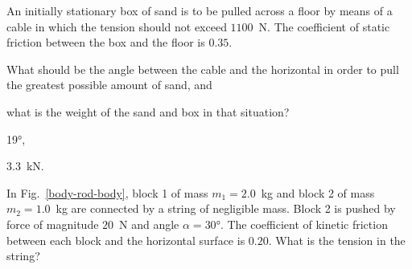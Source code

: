 \begin{problem}
	An initially stationary box of sand is to be pulled across a floor by means of a cable in which the tension should not exceed $1100$~N. The coefficient of static friction between the box and the floor is $0.35$. 
	\begin{enumerate*}[label = (\alph*)]
		\item What should be the angle between the cable and the horizontal in order to pull the greatest possible amount of sand, and
		\item  what is the weight of the sand and box in that situation?
	\end{enumerate*}
	\begin{solution}
		\begin{enumerate*}[label = (\alph*)]
			\item \ang{19},
			\item $3.3$~\si{\kilo\newton}.
		\end{enumerate*}
	\end{solution}
\end{problem}


\begin{problem}\label{prb:body-rod-body}
	In Fig.~\ref{body-rod-body}, block 1 of mass $m_1 = 2.0$~kg and block 2 of mass $m_2 = 1.0$~kg are connected by a string of negligible mass. Block 2 is pushed by force of magnitude $20$~N and angle $\alpha = \ang{30}$. The coefficient of kinetic friction between each block and the horizontal surface is $0.20$. What is the tension in the string?
\end{problem}

